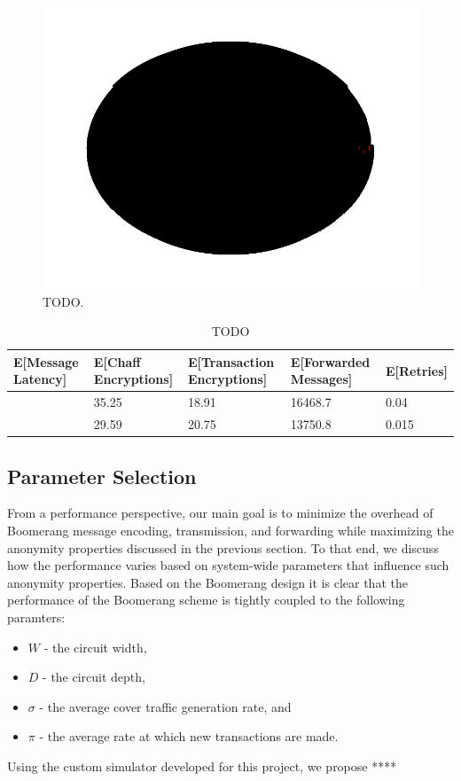 \begin{figure}[ht!]
\begin{center}
\includegraphics[scale=0.5]{./images/sim_2_complete.png}
\caption{TODO.}
\label{fig:boomerang_message}
\end{center}
\end{figure}

\begin{table}
\begin{center}
\caption{TODO}
\label{tab:sim-results}
    \begin{tabular}{|l|l|l|l|l|} \hline
    {\bf E[Message Latency]} & {\bf E[Chaff Encryptions]} & {\bf E[Transaction Encryptions]} & {\bf E[Forwarded Messages]} & {\bf E[Retries]} \\ \hline
    ~ & 35.25 & 18.91 & 16468.7 & 0.04 \\
    ~ & 29.59 & 20.75 & 13750.8 & 0.015 \\ \hline
    \end{tabular}
\end{center}
\end{table}

\subsection{Parameter Selection}

From a performance perspective, our main goal is to minimize the overhead of Boomerang message encoding, transmission, and forwarding while maximizing the anonymity properties discussed in the previous section. To that end, we discuss how the performance varies based on system-wide parameters that influence such anonymity properties. Based on the Boomerang design it is clear that the performance of the Boomerang scheme is tightly coupled to the following paramters:
\begin{itemize}
	\item $W$ - the circuit width,
	\item $D$ - the circuit depth,
	\item $\sigma$ - the average cover traffic generation rate, and
	\item $\pi$ - the average rate at which new transactions are made.
\end{itemize}

Using the custom simulator developed for this project, we propose ****


